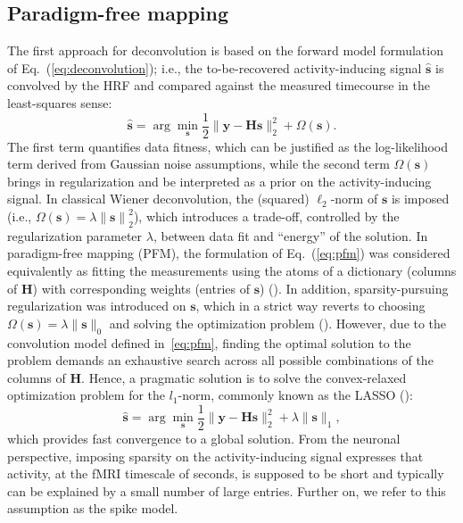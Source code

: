 
\subsection{Paradigm-free mapping}
The first approach for deconvolution is based on the forward model formulation of Eq.~(\ref{eq:deconvolution}); i.e., the to-be-recovered activity-inducing signal $\hat{\mathbf{s}}$ is convolved by the HRF and compared against the measured timecourse in the least-squares sense: 
\begin{equation}
    \label{eq:pfm}
    \hat{\mathbf{s}} = \arg \min_{\mathbf{s}} \frac{1}{2} \| \mathbf{y} - \mathbf{Hs} \|_2^2 + \Omega(\mathbf{s}).
\end{equation}
The first term quantifies data fitness, which can be justified as the log-likelihood term derived from Gaussian noise assumptions, while the second term \(\Omega(\mathbf{s})\) brings in regularization and be interpreted as a prior on the activity-inducing signal. In classical Wiener deconvolution, the (squared) $\ell_2$-norm of $\mathbf{s}$ is imposed (i.e., $\Omega(\mathbf{s})=\lambda \left\| \mathbf{s}\right\|_2^2$), which introduces a trade-off, controlled by the regularization parameter $\lambda$, between data fit and ``energy'' of the solution. In paradigm-free mapping (PFM), the formulation of Eq.~(\ref{eq:pfm}) was considered equivalently as fitting the measurements using the atoms of a dictionary (columns of $\mathbf{H}$) with corresponding weights (entries of $\mathbf{s}$) (\citealt{gaudes2011DetectionCharacterizationSingletrial,caballerogaudes2013ParadigmFreeMapping,urunuela2020StabilityBasedSparseParadigm}). 
In addition, sparsity-pursuing regularization was introduced on $\mathbf{s}$, which in a strict way reverts to choosing \(\Omega(\mathbf{s})=\lambda \| \mathbf{s} \|_0\) and solving the optimization problem (\citealt{bruckstein2009SparseSolutionsSystems}). However, due to the convolution model defined in~\eqref{eq:pfm}, finding the optimal solution to the problem demands an exhaustive search across all possible combinations of the columns of \(\mathbf{H}\). Hence, a  pragmatic solution is to solve the convex-relaxed optimization problem for the \(l_1\)-norm, commonly known as the LASSO (\citealt{tibshirani1996RegressionShrinkageSelection}): 
\begin{equation}
    \label{eq:pfm_spike}
    \hat{\mathbf{s}} = \arg \min_{\mathbf{s}} \frac{1}{2} \| \mathbf{y} - \mathbf{Hs} \|_2^2 + \lambda \| \mathbf{s} \|_1,
\end{equation}
which provides fast convergence to a global solution. From the neuronal perspective, imposing sparsity on the activity-inducing signal expresses that activity, at the fMRI timescale of seconds, is supposed to be short and typically can be explained by a small number of large entries. Further on, we refer to this assumption as the spike model. 


